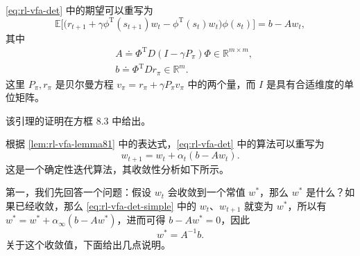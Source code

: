 \begin{lemma}[TD 期望的矩阵表示]
\label{lem:rl-vfa-lemma81}
\cref{eq:rl-vfa-det} 中的期望可以重写为
\begin{equation*}
\mathbb{E}\Big[\big(r_{t+1} + \gamma \phi^{\mathrm{T}}(s_{t+1}) w_{t} - \phi^{\mathrm{T}}(s_{t}) w_{t}\big) \phi(s_{t})\Big] = b - A w_{t},
\end{equation*}
其中
\begin{equation}
\begin{aligned}
& A \doteq \Phi^{\mathrm{T}} D (I - \gamma P_{\pi}) \Phi \in \mathbb{R}^{m \times m}, \\
& b \doteq \Phi^{\mathrm{T}} D r_{\pi} \in \mathbb{R}^{m}.
\end{aligned}
\label{eq:rl-vfa-Ab}
\end{equation}
这里 $P_{\pi}, r_{\pi}$ 是贝尔曼方程 $v_{\pi} = r_{\pi} + \gamma P_{\pi}v_{\pi}$ 中的两个量，而 $I$ 是具有合适维度的单位矩阵。
\end{lemma}

该引理的证明在方框 8.3 中给出。

根据 \cref{lem:rl-vfa-lemma81} 中的表达式，\cref{eq:rl-vfa-det} 中的算法可以重写为
\begin{equation}
w_{t+1} = w_{t} + \alpha_{t} (b - A w_{t}).
\label{eq:rl-vfa-det-simple}
\end{equation}
这是一个确定性迭代算法，其收敛性分析如下所示。

第一，我们先回答一个问题：假设 $w_{t}$ 会收敛到一个常值 $w^{*}$，那么 $w^{*}$ 是什么？如果已经收敛，那么 \cref{eq:rl-vfa-det-simple} 中的 $w_{t}$、$w_{t+1}$ 就变为 $w^{*}$，所以有 $w^{*} = w^{*} + \alpha_{\infty}(b - Aw^{*})$，进而可得 $b - Aw^{*} = 0$，因此
\begin{equation*}
w^{*} = A^{-1} b.
\end{equation*}
关于这个收敛值，下面给出几点说明。

